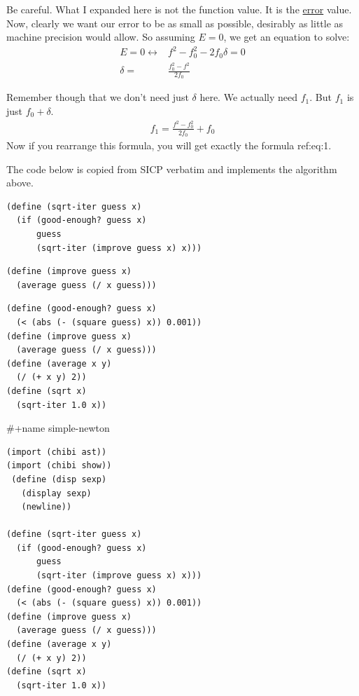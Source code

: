 \documentclass[11pt]{article}
\begin{document}
\begin{enumerate}
\begin{enumerate}
Be careful. What I expanded here is not the function value. It is the
\uline{error} value. Now, clearly we want our error to be as small as
possible, desirably as little as machine precision would allow. So
assuming \(E=0\), we get an equation to solve:
\begin{align}
\label{eq:9}
E=0 \leftrightarrow& f^2-f_0^2-2f_0\delta=0 \\
\delta =& \frac{f_0^2 -f^2 }{2f_0}
\end{align}

Remember though that we don't need just \(\delta\) here. We actually need
\(f_1\). But \(f_1\) is just \(f_0+\delta\).
\begin{align}
\label{eq:10}
f_1 = \frac{f^2 - f_0^2}{2f_0} + f_0
\end{align}
Now if you rearrange this formula, you will get exactly the formula
ref:eq:1.

The code below is copied from SICP verbatim and implements the
algorithm above.

\lstset{language=Lisp,label= ,caption= ,captionpos=b,numbers=none}
\begin{lstlisting}
(define (sqrt-iter guess x)
  (if (good-enough? guess x)
      guess
      (sqrt-iter (improve guess x) x)))
\end{lstlisting}

\lstset{language=Lisp,label= ,caption= ,captionpos=b,numbers=none}
\begin{lstlisting}
(define (improve guess x)
  (average guess (/ x guess)))
\end{lstlisting}

\lstset{language=Lisp,label= ,caption= ,captionpos=b,numbers=none}
\begin{lstlisting}
(define (good-enough? guess x)
  (< (abs (- (square guess) x)) 0.001))
(define (improve guess x)
  (average guess (/ x guess)))
(define (average x y)
  (/ (+ x y) 2))
(define (sqrt x)
  (sqrt-iter 1.0 x))

\end{lstlisting}

\#+name simple-newton
\lstset{language=Lisp,label= ,caption= ,captionpos=b,numbers=none}
\begin{lstlisting}
(import (chibi ast))
(import (chibi show))
 (define (disp sexp)
   (display sexp)
   (newline))

(define (sqrt-iter guess x)
  (if (good-enough? guess x)
      guess
      (sqrt-iter (improve guess x) x)))
(define (good-enough? guess x)
  (< (abs (- (square guess) x)) 0.001))
(define (improve guess x)
  (average guess (/ x guess)))
(define (average x y)
  (/ (+ x y) 2))
(define (sqrt x)
  (sqrt-iter 1.0 x))


\end{lstlisting}
\end{enumerate}
\end{enumerate}
\end{document}
